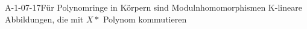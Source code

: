 
\begin{EXA}{A-1-07-17}{Für Polynomringe in Körpern sind Modulnhomomorphismen K-lineare Abbildungen, die mit $X*$ Polynom kommutieren}
\end{EXA}
